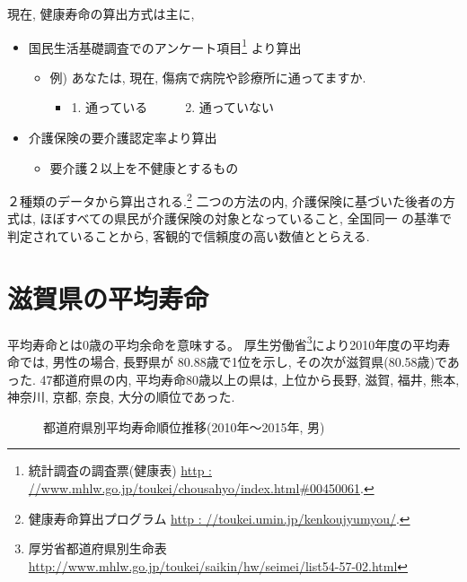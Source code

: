 現在, 健康寿命の算出方式は主に,
\begin{itemize} \setlength{\itemsep}{-0.5mm} \setlength{\parskip}{-0.5mm}
	\item 国民生活基礎調査でのアンケート項目\footnote{
		      統計調査の調査票(健康表)
		      \url{http : //www.mhlw.go.jp/toukei/chousahyo/index.html#00450061}.
	      }
	      より算出
	      \begin{itemize} \setlength{\itemsep}{-0.5mm} \setlength{\parskip}{-0.5mm}
		      \item 例) あなたは, 現在, 傷病で病院や診療所に通ってますか.
		            \begin{itemize} \setlength{\itemsep}{-0.5mm} \setlength{\parskip}{-0.5mm}
			            \item[] 1. 通っている~~~~~~2. 通っていない
		            \end{itemize}
	      \end{itemize}

	\item 介護保険の要介護認定率より算出
	      \begin{itemize} \setlength{\itemsep}{-0.5mm} \setlength{\parskip}{-0.5mm}
		      \item 要介護２以上を不健康とするもの
	      \end{itemize}
\end{itemize}
２種類のデータから算出される.\footnote{
	健康寿命算出プログラム
	\url{http : //toukei.umin.jp/kenkoujyumyou/}.
}
二つの方法の内, 介護保険に基づいた後者の方式は,
ほぼすべての県民が介護保険の対象となっていること, 全国同一
の基準で判定されていることから, 客観的で信頼度の高い数値ととらえる.

\section{滋賀県の平均寿命}
平均寿命とは0歳の平均余命を意味する。
厚生労働省\footnote{
	厚労省都道府県別生命表
	\url{http://www.mhlw.go.jp/toukei/saikin/hw/seimei/list54-57-02.html}}により2010年度の平均寿命では,
男性の場合, 長野県が 80.88歳で1位を示し, その次が滋賀県(80.58歳)であった. 47都道府県の内, 平均寿命80歳以上の県は,
上位から長野, 滋賀,  福井, 熊本,  神奈川,   京都,   奈良,   大分の順位であった.

\begin{figure}[h!]
	\begin{center}
		\caption{都道府県別平均寿命順位推移(2010年〜2015年, 男)}
	\end{center}
\end{figure}

